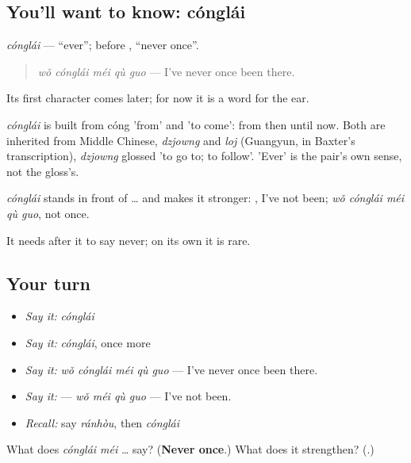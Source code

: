 \subsection*{You'll want to know: cónglái}
\emph{cónglái} — \textquotedblleft{}ever\textquotedblright{}; before , \textquotedblleft{}never once\textquotedblright{}.

\begin{quote}
\emph{wǒ cónglái méi qù guo} — I've never once been there.
\end{quote}

Its first character comes later; for now it is a word for the ear.

\begin{cousinweb}
\emph{cónglái} is built from cóng 'from' and  'to come': from then until now. Both are inherited from Middle Chinese, \emph{dzjowng} and \emph{loj} (Guangyun, in Baxter's transcription), \emph{dzjowng} glossed 'to go to; to follow'. 'Ever' is the pair's own sense, not the gloss's.
\end{cousinweb}

\begin{grammarlens}[title={What you've built}]
\emph{cónglái} stands in front of  …  and makes it stronger: , I've not been; \emph{wǒ cónglái méi qù guo}, not once.

It needs  after it to say never; on its own it is rare.
\end{grammarlens}

\subsection*{Your turn}
\begin{itemize}
\raggedright
  \item \emph{Say it:} \emph{cónglái}
  \item \emph{Say it:} \emph{cónglái}, once more
  \item \emph{Say it:} \emph{wǒ cónglái méi qù guo} — I've never once been there.
  \item \emph{Say it:}  — \emph{wǒ méi qù guo} — I've not been.
  \item \emph{Recall:} say \emph{ránhòu}, then \emph{cónglái}
\end{itemize}

\begin{tcolorbox}[breakable,colback=teal!4,colframe=teal!35!black,title={Before you move on}]
What does \emph{cónglái méi} …  say? (\textbf{Never once}.) What does it strengthen? (\textbf{}.)
\end{tcolorbox}
